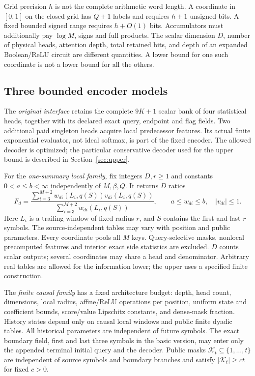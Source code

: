 \documentclass[11pt,letterpaper]{article}
\theoremstyle{definition}\newtheorem{definition}[theorem]{Definition}
\theoremstyle{remark}\newtheorem{remark}[theorem]{Remark}
\begin{document}
Grid precision $h$ is not the complete arithmetic word length. A coordinate in $[0,1]$ on the closed grid has $Q+1$ labels and requires $h+1$ unsigned bits. A fixed bounded signed range requires $h+O(1)$ bits. Accumulators must additionally pay $\log M$, signs and full products. The scalar dimension $D$, number of physical heads, attention depth, total retained bits, and depth of an expanded Boolean/ReLU circuit are different quantities. A lower bound for one such coordinate is not a lower bound for all the others.

\subsection{Three bounded encoder models}
The \emph{original interface} retains the complete $9K+1$ scalar bank of four statistical heads, together with its declared exact query, endpoint and flag fields. Two additional paid singleton heads acquire local predecessor features. Its actual finite exponential evaluator, not ideal softmax, is part of the fixed encoder. The allowed decoder is optimized; the particular conservative decoder used for the upper bound is described in Section~\ref{sec:upper}.

For the \emph{one-summary local family}, fix integers $D,r\ge1$ and constants $0<a\le b<\infty$ independently of $M,\beta,Q$. It returns $D$ ratios
\begin{equation}\label{eq:localratio}
 F_d=\frac{\sum_{i=3}^{M+2} w_{di}(L_i,q(S))v_{di}(L_i,q(S))}
 {\sum_{i=3}^{M+2} w_{di}(L_i,q(S))},\qquad
 a\le w_{di}\le b,\quad |v_{di}|\le1.
\end{equation}
Here $L_i$ is a trailing window of fixed radius $r$, and $S$ contains the first and last $r$ symbols. The source-independent tables may vary with position and public parameters. Every coordinate pools all $M$ keys. Query-selective masks, nonlocal precomputed features and interior exact side statistics are excluded. $D$ counts scalar outputs; several coordinates may share a head and denominator. Arbitrary real tables are allowed for the information lower; the upper uses a specified finite construction.

The \emph{finite causal family} has a fixed architecture budget: depth, head count, dimensions, local radius, affine/ReLU operations per position, uniform state and coefficient bounds, score/value Lipschitz constants, and dense-mask fraction. History states depend only on causal local windows and public finite dyadic tables. All historical parameters are independent of future symbols. The exact boundary field, first and last three symbols in the basic version, may enter only the appended terminal initial query and the decoder. Public masks $\mathcal K_t\subseteq\{1,\ldots,t\}$ are independent of source symbols and boundary branches and satisfy $|\mathcal K_t|\ge ct$ for fixed $c>0$.
\end{document}
